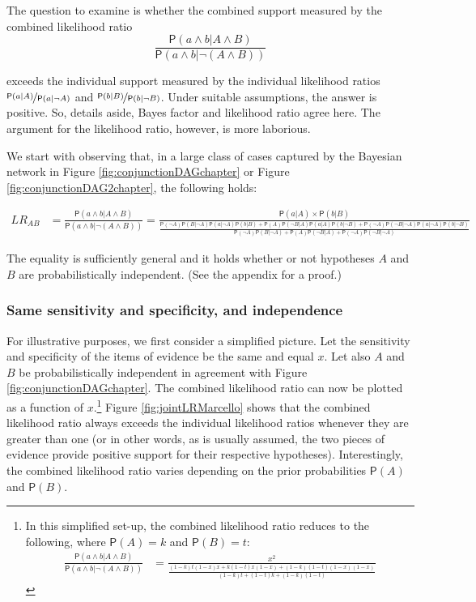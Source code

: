\documentclass[
  10pt,
  dvipsnames,enabledeprecatedfontcommands]{scrartcl}
\newcommand{\et}{\wedge}
\newcommand{\pr}[1]{\ensuremath{\mathsf{P}(#1)}}
\begin{document}
The question to examine is whether the combined support measured by the
combined likelihood ratio
\[\frac{\pr{a\wedge b \vert A\wedge B}}{\pr{a \wedge b \vert \neg (A\wedge B)}}\]

\noindent exceeds the individual support measured by the individual
likelihood ratios \(\nicefrac{\pr{a \vert A}}{\pr{a \vert \neg A}}\) and
\(\nicefrac{\pr{b \vert B}}{\pr{b \vert \neg B}}\). Under suitable
assumptions, the answer is positive. So, details aside, Bayes factor and
likelihood ratio agree here. The argument for the likelihood ratio,
however, is more laborious.

We start with observing that, in a large class of cases captured by the
Bayesian network in Figure \ref{fig:conjunctionDAGchapter} or Figure
\ref{fig:conjunctionDAG2chapter}, the following holds:

\begin{align*}
LR_{AB} & = \frac{\pr{a\wedge b \vert A\wedge B}}{\pr{a \wedge b \vert \neg (A\wedge B)}} = \frac{\pr{a \vert A} \times \pr{b \vert B}}
 {\frac{\pr{\neg A}\pr{B \vert \neg A} \pr{a \vert \neg A}\pr{b \vert B} + \pr{A}\pr{\neg B \vert A} \pr{a \vert A }\pr{b \vert \neg B} + \pr{\neg A}\pr{\neg B \vert \neg A } \pr{a \vert \neg A}\pr{b \vert \neg B}}{\pr{\neg A}\pr{B \vert \neg A} + \pr{A}\pr{\neg B \vert A } + \pr{\neg A}\pr{\neg B \vert \neg A} }}
\end{align*}

\noindent The equality is sufficiently general and it holds whether or
not hypotheses \(A\) and \(B\) are probabilistically independent. (See
the appendix for a proof.)

\hypertarget{same-sensitivity-and-specificity-and-independence}{%
\subsubsection{Same sensitivity and specificity, and
independence}\label{same-sensitivity-and-specificity-and-independence}}

For illustrative purposes, we first consider a simplified picture. Let
the sensitivity and specificity of the items of evidence be the same and
equal \(x\). Let also \(A\) and \(B\) be probabilistically independent
in agreement with Figure \ref{fig:conjunctionDAGchapter}. The combined
likelihood ratio can now be plotted as a function of \(x\).\footnote{In
  this simplified set-up, the combined likelihood ratio reduces to the
  following, where \(\pr{A}=k\) and \(\pr{B}=t\): \begin{align*}
  \frac{\pr{a \wedge b \vert A\wedge B}}{\pr{a \et b\vert \neg (A\et B)}} & = \frac{x^2}{\frac{(1-k)t(1-x)x + k(1-t)x(1-x) + (1-k)(1-t)(1-x)(1-x)}{ \left(1-k\right) t +\left(1-t\right) k+\left(1-k\right) \left(1-t\right)}}
   \end{align*}} Figure \ref{fig:jointLRMarcello} shows that the
combined likelihood ratio always exceeds the individual likelihood
ratios whenever they are greater than one (or in other words, as is
usually assumed, the two pieces of evidence provide positive support for
their respective hypotheses). Interestingly, the combined likelihood
ratio varies depending on the prior probabilities \(\pr{A}\) and
\(\pr{B}\).
\end{document}
